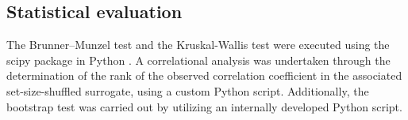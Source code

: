 \subsection{Statistical evaluation}
The Brunner--Munzel test and the Kruskal-Wallis test were executed using the scipy package in Python \cite{virtanen_scipy_2020}. A correlational analysis was undertaken through the determination of the rank of the observed correlation coefficient in the associated set-size-shuffled surrogate, using a custom Python script. Additionally, the bootstrap test was carried out by utilizing an internally developed Python script.

\label{sec:methods}